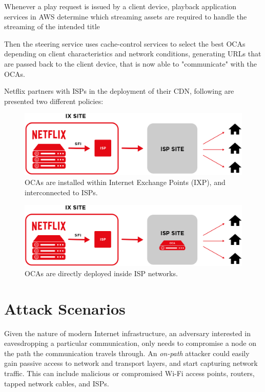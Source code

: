 Whenever a play request is issued by a client device, playback application
services in AWS determine which streaming assets are required to handle the
streaming of the intended title

Then the steering service uses cache-control services to select the best OCAs
depending on client characteristics and network conditions, generating URLs
that are passed back to the client device, that is now able to "communicate"
with the OCAs.

Netflix partners with ISPs in the deployment of their CDN, following are
presented two different policies:

\begin{figure}[!htb]
  \centering
  \includegraphics[width=\columnwidth]{img/oca_1.png}
  \caption{OCAs are installed within Internet Exchange Points (IXP), and
  interconnected to ISPs. \cite{netflix_oca}}
  \label{fig:oca_1}
\end{figure}

\begin{figure}[!htb]
  \centering
  \includegraphics[width=\columnwidth]{img/oca_2.png}
  \caption{OCAs are directly deployed inside ISP networks. \cite{netflix_oca}}
  \label{fig:oca_2}
\end{figure}

\section{Attack Scenarios}\label{attack_scenarios}

Given the nature of modern Internet infrastructure, an adversary interested in
eavesdropping a particular communication, only needs to compromise a node on
the path the communication travels through. An \emph{on-path} attacker could
easily gain passive access to network and transport layers, and start capturing
network traffic. This can include malicious or compromised Wi-Fi access
points, routers, tapped network cables, and ISPs. 

